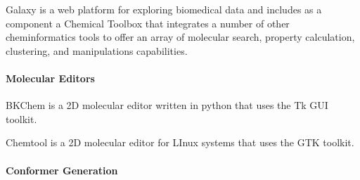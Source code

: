 Galaxy \cite{Goecks_2010} is a web platform for exploring biomedical data and includes as a component a Chemical Toolbox that integrates a number of other cheminformatics tools to offer an array of molecular search, property calculation, clustering, and manipulations capabilities.


\paragraph{Molecular Editors}

BKChem is a 2D molecular editor written in python that uses the Tk GUI toolkit.

Chemtool is a 2D molecular editor for LInux systems that uses the GTK toolkit.

\paragraph{Conformer Generation}

